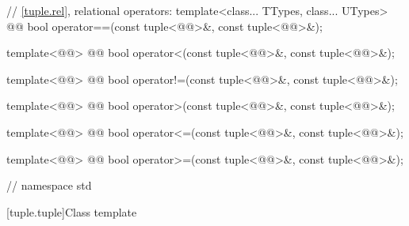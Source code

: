 \documentclass[american,twoside]{book}
\begin{document}
\begin{codeblock}
{  // \ref{tuple.rel}, relational operators:
  template<class... TTypes, class... UTypes>
    @@
    bool operator==(const tuple<@@>&, const tuple<@@>&);

  template<@@>
    @@
    bool operator<(const tuple<@@>&, const tuple<@@>&);

  template<@@>
    @@
    bool operator!=(const tuple<@@>&, const tuple<@@>&);

  template<@@>
    @@
    bool operator>(const tuple<@@>&, const tuple<@@>&);

  template<@@>
    @@
    bool operator<=(const tuple<@@>&, const tuple<@@>&);

  template<@@>
    @@
    bool operator>=(const tuple<@@>&, const tuple<@@>&);

} // namespace std
\end{codeblock}

[tuple.tuple]{Class template }
\end{document}
